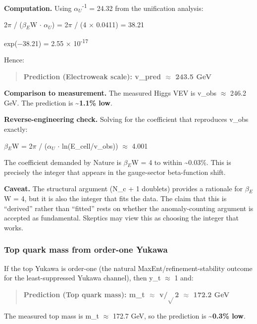 \documentclass[11pt,a4paper]{article}
\theoremstyle{remark}
\begin{document}
\textbf{Computation.} Using \(\alpha_U\)\textsuperscript{-1} = 24.32 from the unification analysis:

2\ensuremath{\pi} / (\(\beta{}_E\)W \ensuremath{\cdot} \(\alpha_U\)) = 2\ensuremath{\pi} / (4 \ensuremath{\times} 0.0411) = 38.21

exp(\ensuremath{-}38.21) = 2.55 \ensuremath{\times} 10\textsuperscript{-17}

Hence:

\begin{quote}
\textbf{Prediction (Electroweak scale): v\_pred \ensuremath{\approx} 243.5 GeV}
\end{quote}

\textbf{Comparison to measurement.} The measured Higgs VEV is v\_obs \ensuremath{\approx} 246.2 GeV.
The prediction is \textbf{\textasciitilde1.1\% low}.

\textbf{Reverse-engineering check.} Solving for the coefficient that reproduces v\_obs exactly:

\(\beta{}_E\)W = 2\ensuremath{\pi} / (\(\alpha_U\) \ensuremath{\cdot} ln(E\_cell/v\_obs)) \ensuremath{\approx} 4.001

The coefficient demanded by Nature is \(\beta{}_E\)W = 4 to within \textasciitilde0.03\%. This is precisely the integer that appears in the gauge-sector beta-function shift.

\textbf{Caveat.} The structural argument (N\_c + 1 doublets) provides a rationale for \(\beta{}_E\)W = 4, but it is also the integer that fits the data. The claim that this is ``derived'' rather than ``fitted'' rests on whether the anomaly-counting argument is accepted as fundamental. Skeptics may view this as choosing the integer that works.

\subsubsection{Top quark mass from order-one Yukawa}\label{top-quark-mass-from-order-one-yukawa}

If the top Yukawa is order-one (the natural MaxEnt/refinement-stability outcome for the least-suppressed Yukawa channel), then y\_t \ensuremath{\approx} 1 and:

\begin{quote}
\textbf{Prediction (Top quark mass): m\_t \ensuremath{\approx} v/\ensuremath{\sqrt{}}2 \ensuremath{\approx} 172.2 GeV}
\end{quote}

The measured top mass is m\_t \ensuremath{\approx} 172.7 GeV, so the prediction is \textbf{\textasciitilde0.3\% low}.
\end{document}
